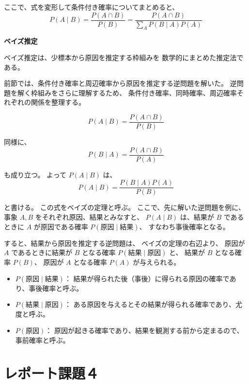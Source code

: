 \documentclass[10pt,a4paper,titlepage]{jreport} %
\begin{document}
ここで、式を変形して条件付き確率についてまとめると、
\begin{equation}
P(A \mid B)
= \frac{P(A \cap B)}{P(B)}
= \frac{P(A \cap B)}{\sum_{A} P(B \mid A)P(A)}
\end{equation}

\textbf{ベイズ推定}

ベイズ推定は、少標本から原因を推定する枠組みを
数学的にまとめた推定法である。

前節では、条件付き確率と周辺確率から原因を推定する逆問題を解いた。
逆問題を解く枠組みをさらに理解するため、
条件付き確率、同時確率、周辺確率それぞれの関係を整理する。

\begin{equation}
P(A \mid B) = \frac{P(A \cap B)}{P(B)}
\end{equation}

同様に、
\begin{equation}
P(B \mid A) = \frac{P(A \cap B)}{P(A)}
\end{equation}

も成り立つ。
よって $P(A \mid B)$ は、
\begin{equation}
P(A \mid B) = \frac{P(B \mid A)P(A)}{P(B)}
\end{equation}

と書ける。
この式をベイズの定理と呼ぶ。
ここで、先に解いた逆問題を例に、
事象 $A, B$ をそれぞれ原因、結果とみなすと、
$P(A \mid B)$ は、結果が $B$ であるときに $A$ が原因である確率
$P(\text{原因} \mid \text{結果})$、
すなわち事後確率となる。

すると、結果から原因を推定する逆問題は、
ベイズの定理の右辺より、
原因が $A$ であるときに結果が $B$ となる確率
$P(\text{結果} \mid \text{原因})$ と、
結果が $B$ となる確率 $P(B)$、
原因が $A$ となる確率 $P(A)$ が与えられる。

\begin{itemize}
\item $P(\text{原因} \mid \text{結果})$：
結果が得られた後（事後）に得られる原因の確率であり、事後確率と呼ぶ。
\item $P(\text{結果} \mid \text{原因})$：
ある原因を与えるとその結果が得られる確率であり、尤度と呼ぶ。
\item $P(\text{原因})$：
原因が起きる確率であり、結果を観測する前から定まるので、事前確率と呼ぶ。
\end{itemize}

\section{レポート課題４}
\end{document}
